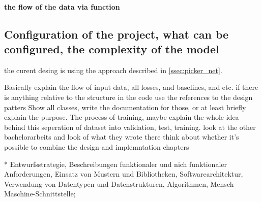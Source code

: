 \paragraph{the flow of the data via function}


\subsection{Configuration of the project, what can be configured, the complexity of the model}





the curent desing is using the approach
described in \autoref{ssec:picker_net}.

Basically explain the flow of input data, all losses, and baselines, and etc.
if there is anything relative to the structure in the code use the references to the design patters
Show all classes, write the documentation for those, or at least briefly explain the purpose.
The process of training, maybe explain the whole idea behind this
	seperation of dataset into validation, test, training.
look at the other bachelorarbeits and look of what they wrote there
think about whether it's possible to combine the design and implemntation chapters



* Entwurfsstrategie, Beschreibungen funktionaler und nich
 funktionaler Anforderungen, Einsatz von Mustern und
 Bibliotheken, Softwarearchitektur, Verwendung von Datentypen und
 Datenstrukturen, Algorithmen, Mensch-Maschine-Schnittstelle;
